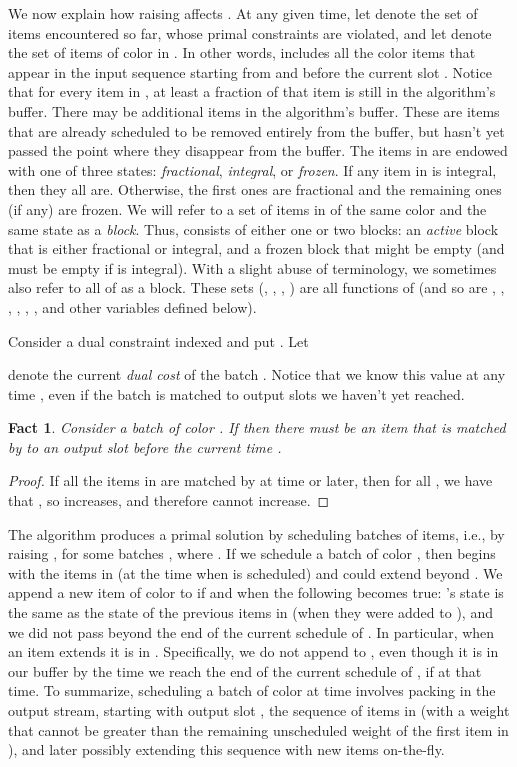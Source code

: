 \documentclass[12pt]{article}
\newtheorem{fact}[theorem]{Fact}
\begin{document}
We now explain how raising  affects
. At any given time, let  denote the set of
items encountered so far, whose primal constraints are
violated, and let  denote the set of items of color
 in . In other words,  includes all the color
 items that appear in the input sequence starting from
 and before the current slot .
Notice that for every item in , at least a
fraction of that item is still in the algorithm's buffer.
There may be additional items in the algorithm's buffer.
These are items that are already scheduled to be removed
entirely from the buffer, but  hasn't yet passed
the point where they disappear from the buffer. The items
in  are endowed with one of three states: {\em fractional},
{\em integral}, or {\em frozen}. If any item in  is integral,
then they all are. Otherwise, the first ones are fractional and the 
remaining ones (if any) are frozen. We
will refer to a set of items in  of the same color and the same
state as a {\em block}. Thus,  consists of either one or two
blocks: an {\em active} block  that is either fractional
or integral, and a frozen block  that might be empty
(and must be empty if  is integral). With a slight abuse
of terminology, we sometimes also refer to all of  as a block.
These sets (, , , ) are all functions 
of  (and so are , , , , , , 
and other variables defined below).

Consider a dual constraint indexed  and put . Let

denote the current {\em dual cost} of the batch . Notice that we 
know this value at any time , even if the batch is matched to 
output slots we haven't yet reached.
\begin{fact}
Consider a batch  of color . If
 then there must be an item
 that is matched by  to an output
slot before the current time .
\end{fact}

\begin{proof}
If all the items in  are matched by  at time 
or later, then for all , we have that ,
so  increases, and therefore  cannot 
increase.
\end{proof}

The algorithm produces a primal solution  by scheduling
batches of items, i.e., by raising , for some batches
, where . If we schedule a batch  of 
color , then 
begins with the items in  (at the time  when
 is scheduled) and  could extend beyond
. We append a new item  of color  to  if
and when the following becomes true: 's state is the same as 
the state of the previous 
items in  (when they were added to ), and we did not
pass beyond the end of the current schedule of . 
In particular, when an item extends  it 
is in . Specifically, we do not append 
to , even though it is in our buffer by the time we reach
the end of the current schedule of , if 
at that time.
To summarize, scheduling a batch of color  at time 
involves packing in the output stream, starting with output slot 
, 
the sequence of items in  (with a weight
that cannot be greater than the remaining unscheduled weight of the 
first item in ), and later possibly extending this sequence 
with new items on-the-fly.
\end{document}
